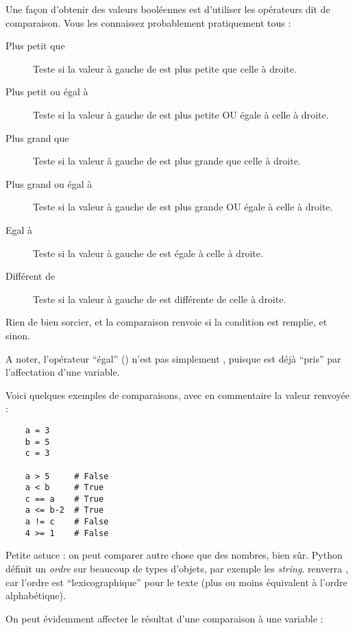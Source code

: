 Une façon d'obtenir des valeurs booléennes est d'utiliser les opérateurs dit de comparaison. Vous les connaissez probablement pratiquement tous :

\begin{description}
    \item[\codeintext{<} Plus petit que] Teste si la valeur à gauche de \codeintext{<} est plus petite que celle à droite. 
    \item[\codeintext{<=} Plus petit ou égal à] Teste si la valeur à gauche de \codeintext{<=} est plus petite OU égale à celle à droite.
    \item[\codeintext{>} Plus grand que] Teste si la valeur à gauche de \codeintext{>} est plus grande que celle à droite.
    \item[\codeintext{>=} Plus grand ou égal à] Teste si la valeur à gauche de \codeintext{>=} est plus grande OU égale à celle à droite.
    \item[\codeintext{==} Egal à] Teste si la valeur à gauche de \codeintext{==} est égale à celle à droite.
    \item[\codeintext{!=} Différent de] Teste si la valeur à gauche de \codeintext{!=} est différente de celle à droite.
\end{description}

Rien de bien sorcier, et la comparaison renvoie  si la condition est remplie, et  sinon.

A noter, l'opérateur ``égal'' (\codeintext{==}) n'est pas simplement \codeintext{=}, puisque \codeintext{=} est déjà ``pris'' par l'affectation d'une variable.

Voici quelques exemples de comparaisons, avec en commentaire la valeur renvoyée :

\begin{lstlisting}
    a = 3
    b = 5
    c = 3

    a > 5     # False
    a < b     # True
    c == a    # True
    a <= b-2  # True
    a != c    # False
    4 >= 1    # False
\end{lstlisting}

Petite astuce : on peut comparer autre chose que des nombres, bien sûr. Python définit un \emph{ordre} sur beaucoup de types d'objets, par exemple les \emph{string}.  renverra , car l'ordre est ``lexicographique'' pour le texte (plus ou moins équivalent  à l'ordre alphabétique).

On peut évidemment affecter le résultat d'une comparaison à une variable :

